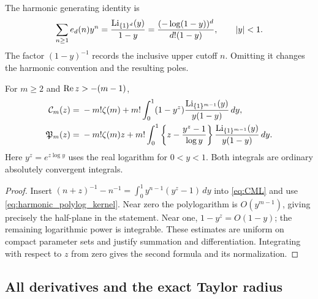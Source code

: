 The harmonic generating identity is
\begin{equation}\label{eq:harmonic_polylog_kernel}
 \sum_{n\ge1}e_d(n)y^n
    =\frac{\operatorname{Li}_{\{1\}^d}(y)}{1-y}
    =\frac{(-\log(1-y))^d}{d!(1-y)},\qquad |y|<1.
\end{equation}
The factor $(1-y)^{-1}$ records the inclusive upper cutoff $n$.
Omitting it changes the harmonic convention and the resulting poles.

\begin{corollary}
\label{cor:Cpolylog}
For $m\ge2$ and $\operatorname{Re} z>-(m-1)$,
\begin{align}
 \mathcal C_m(z)={}&-m!\zeta(m)
  +m!\int_0^1(1-y^z)
       \frac{\operatorname{Li}_{\{1\}^{m-1}}(y)}{y(1-y)}\,dy,
 \label{eq:Cpolylog}\\
 \mathfrak P_m(z)={}&-m!\zeta(m)z
  +m!\int_0^1\left\{z-\frac{y^z-1}{\log y}\right\}
       \frac{\operatorname{Li}_{\{1\}^{m-1}}(y)}{y(1-y)}\,dy.
 \label{eq:Ppolylog}
\end{align}
Here $y^z=e^{z\log y}$ uses the real logarithm for $0<y<1$.
Both integrals are ordinary absolutely convergent integrals.
\end{corollary}
\begin{proof}
Insert $(n+z)^{-1}-n^{-1}=\int_0^1y^{n-1}(y^z-1)\,dy$
into \eqref{eq:CML} and use \eqref{eq:harmonic_polylog_kernel}.
Near zero the polylogarithm is $O(y^{m-1})$, giving precisely
the half-plane in the statement. Near one, $1-y^z=O(1-y)$;
the remaining logarithmic power is integrable. These estimates are
uniform on compact parameter sets and justify summation and
differentiation. Integrating with respect to $z$ from zero gives
the second formula and its normalization.
\end{proof}

\subsection{All derivatives and the exact Taylor radius}

